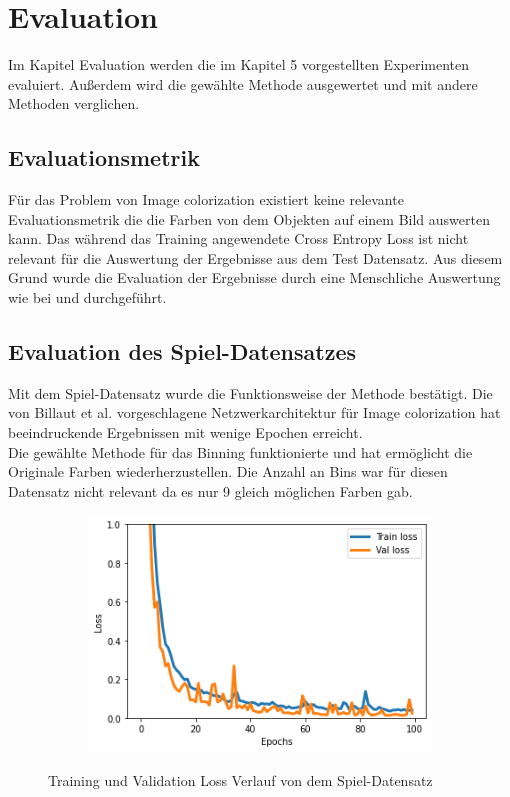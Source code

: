 \chapter{Evaluation}
\label{sec:evaluation}
Im Kapitel Evaluation werden die im Kapitel 5 vorgestellten Experimenten evaluiert. Außerdem wird die gewählte Methode ausgewertet und
mit andere Methoden verglichen.

\section{Evaluationsmetrik}
Für das Problem von Image colorization existiert keine relevante Evaluationsmetrik die die Farben von dem Objekten auf einem Bild auswerten kann.
Das während das Training angewendete Cross Entropy Loss ist nicht relevant für die Auswertung der Ergebnisse aus dem Test Datensatz. Aus diesem
Grund wurde die Evaluation der Ergebnisse durch eine Menschliche Auswertung wie bei \cite{zhang2016colorful} und \cite{billaut2018colorunet}
durchgeführt.

\section{Evaluation des Spiel-Datensatzes}
Mit dem Spiel-Datensatz wurde die Funktionsweise der Methode bestätigt. Die von Billaut et al. vorgeschlagene Netzwerkarchitektur für Image
colorization hat beeindruckende Ergebnissen mit wenige Epochen erreicht. 
\\
Die gewählte Methode für das Binning funktionierte und hat ermöglicht die Originale Farben wiederherzustellen. Die Anzahl an 
Bins war für diesen Datensatz nicht relevant da es nur 9 gleich möglichen Farben gab.

\begin{figure}[H]
  \vspace{1cm}
  \centering
  \begin{subfigure}
    \centering
    \includegraphics[width=.5\textwidth]{resources/experiments/toy_100_324_0001.png}
  \end{subfigure}
  \caption{Training und Validation Loss Verlauf von dem Spiel-Datensatz}
  \label{image:toy-dataset-loss}
\end{figure}

